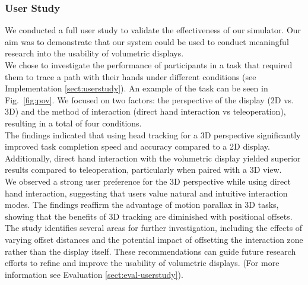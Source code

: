\subsubsection{User Study}

We conducted a full user study to validate the effectiveness of our simulator. Our aim was to demonstrate that our system could be used to conduct meaningful research into the usability of volumetric displays. \\

We chose to investigate the performance of participants in a task that required them to trace a path with their hands under different conditions (see Implementation \ref{sect:userstudy}). An example of the task can be seen in Fig.~\ref{fig:pov}. We focused on two factors: the perspective of the display (2D vs. 3D) and the method of interaction (direct hand interaction vs teleoperation), resulting in a total of four conditions. \\

The findings indicated that using head tracking for a 3D perspective significantly improved task completion speed and accuracy compared to a 2D display. Additionally, direct hand interaction with the volumetric display yielded superior results compared to teleoperation, particularly when paired with a 3D view. \\

We observed a strong user preference for the 3D perspective while using direct hand interaction, suggesting that users value natural and intuitive interaction modes. The findings reaffirm the advantage of motion parallax in 3D tasks, showing that the benefits of 3D tracking are diminished with positional offsets. \\

The study identifies several areas for further investigation, including the effects of varying offset distances and the potential impact of offsetting the interaction zone rather than the display itself. These recommendations can guide future research efforts to refine and improve the usability of volumetric displays. (For more information see Evaluation \ref{sect:eval-userstudy}).

